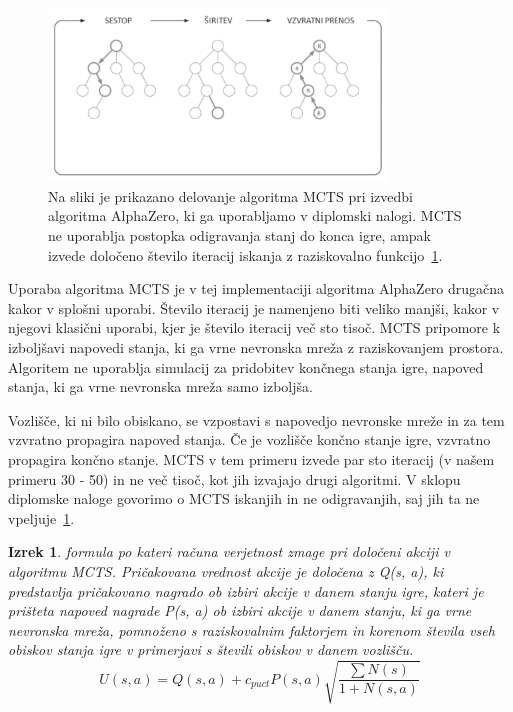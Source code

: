 \documentclass[a4paper, 12pt]{book}
\newtheorem{izrek}{Izrek}[chapter]
\begin{document}
\begin{figure}[h!]
	\begin{center}
		\includegraphics[width=0.8\textwidth]{photos/modifiedMCTS.pdf}
	\end{center}
	\caption{Na sliki je prikazano delovanje algoritma MCTS pri izvedbi algoritma AlphaZero, ki ga uporabljamo v diplomski nalogi. 
		MCTS ne uporablja postopka odigravanja stanj do konca igre, ampak izvede določeno število iteracij iskanja z raziskovalno funkcijo~\ref{iz:1}. }
	\label{modifiedMCTS}
\end{figure}

Uporaba algoritma MCTS je v tej implementaciji algoritma AlphaZero drugačna kakor v splošni uporabi.
Število iteracij je namenjeno biti veliko manjši, kakor v njegovi klasični uporabi, kjer je število iteracij več sto tisoč. 
MCTS pripomore k izboljšavi napovedi stanja, ki ga vrne nevronska mreža z raziskovanjem prostora.
Algoritem ne uporablja simulacij za pridobitev končnega stanja igre, napoved stanja, ki ga vrne nevronska mreža samo izboljša.

Vozlišče, ki ni bilo obiskano, se vzpostavi s napovedjo nevronske mreže in za tem vzvratno propagira napoved stanja.
Če je vozlišče končno stanje igre, vzvratno propagira končno stanje.
MCTS v tem primeru izvede par sto iteracij (v našem primeru 30 - 50) in ne več tisoč, kot jih izvajajo drugi algoritmi.
V sklopu diplomske naloge govorimo o MCTS iskanjih in ne odigravanjih, saj jih ta ne vpeljuje~\ref{modifiedMCTS}.

\begin{izrek}
	\label{iz:1}
	formula po kateri računa verjetnost zmage pri določeni akciji v algoritmu MCTS. 
	Pričakovana vrednost akcije je določena z Q(s, a), ki predstavlja pričakovano nagrado ob izbiri akcije v danem stanju igre, kateri je prišteta napoved nagrade P(s, a) ob izbiri akcije v danem stanju, ki ga vrne nevronska mreža, pomnoženo s raziskovalnim faktorjem in korenom števila vseh obiskov stanja igre v primerjavi s števili obiskov v danem vozlišču.
	\begin{equation}
	U(s, a) = Q(s, a) + c_{puct}P(s, a)\sqrt{\dfrac{\sum{N(s)}}{1+N(s, a)}}
	\label{eq:mctsFormula}
	\end{equation}
\end{izrek}
\end{document}
